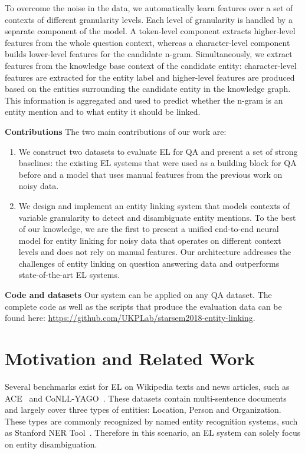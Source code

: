 \documentclass[11pt,a4paper]{article}
\begin{document}
To overcome the noise in the data, we automatically learn features over a set of contexts of different granularity levels.
Each level of granularity is handled by a separate component of the model. A token-level component extracts higher-level features from the whole question context, whereas a character-level component builds lower-level features for the candidate n-gram. Simultaneously, we extract features from the knowledge base context of the candidate entity: character-level features are extracted for the entity label and higher-level features are produced based on the entities surrounding the candidate entity in the knowledge graph. This information is aggregated and used to predict whether the n-gram is an entity mention and to what entity it should be linked.

\textbf{Contributions} The two main contributions of our work are:
  \begin{enumerate}[label=(\roman*)]
    \item We construct two datasets to evaluate EL for QA and present a set of strong baselines: the existing EL systems that were used as a building block for QA before and a model that uses manual features from the previous work on noisy data.
    \item We design and implement an entity linking system that models contexts of variable granularity to detect and disambiguate entity mentions. To the best of our knowledge, we are the first to present a unified end-to-end neural model for entity linking for noisy data that operates on different context levels and does not rely on manual features.
    Our architecture addresses the challenges of entity linking on question answering data and outperforms state-of-the-art EL systems.
  \end{enumerate}

  \textbf{Code and datasets} Our system can be applied on any QA dataset. 
	The complete code as well as the scripts that produce the evaluation data can be found here: \url{https://github.com/UKPLab/starsem2018-entity-linking}.

\section{Motivation and Related Work}

Several benchmarks exist for EL on Wikipedia texts and news articles, such as ACE~\cite{Bentivogli2010} and CoNLL-YAGO~\cite{Hoffart2011a}. These datasets contain multi-sentence documents and largely cover three types of entities: Location, Person and Organization. These types are commonly recognized by named entity recognition systems, such as Stanford NER Tool~\cite{Manning2014}. Therefore in this scenario, an EL system can solely focus on entity disambiguation.
\end{document}

